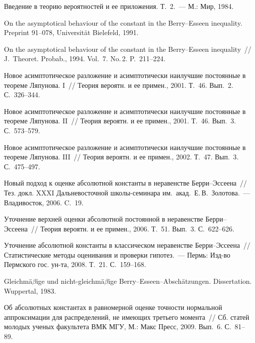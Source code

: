 \begin{multicols}{2}
{{\begin{thebibliography}{99}
 Введение в теорию вероятностей и ее приложения.
Т.~2.~--- М.: Мир, 1984.

 On the asymptotical behaviour of the constant in
the Berry--Esseen inequality. Preprint 91--078, Universit\"at
Bielefeld, 1991.

 On the asymptotical behaviour of the constant in
the Berry--Esseen inequality~// J.~Theoret. Probab., 1994. Vol.~7.
No.\,2. P.~211--224.

 Новое асимптотическое разложение и
асимптотически наилучшие постоянные в теореме Ляпунова. I~// Теория
вероятн. и ее примен., 2001. Т.~46. Вып.~2. С.~326--344.

 Новое асимптотическое разложение и
асимптотически наилучшие постоянные в теореме Ляпунова. II~// Теория
вероятн. и ее примен., 2001. Т.~46. Вып.~3. С.~573--579.

 Новое асимптотическое разложение и
асимптотически наилучшие постоянные в теореме Ляпунова. III~//
Теория вероятн. и ее примен., 2002. Т.~47. Вып.~3. С.~475--497.

Новый подход к оценке абсолютной константы в неравенстве Берри--Эссеена~// Тез. докл. XXXI
Дальневосточной школы-семинара им.\ акад.\ Е.\,В.~Золотова.~---
Владивосток, 2006. C.~19.

 Уточнение верхней оценки абсолютной постоянной в
неравенстве Берри--Эссеена~// Теория вероятн. и ее примен., 2006.
Т.~51. Вып.~3. С.~622--626.

 Уточнение абсолютной константы в классическом
неравенстве Берри--Эссеена~// Статистические методы оценивания и
проверки гипотез.~--- Пермь: Изд-во Пермского гос.
ун-та, 2008. Т.~21. С.~159--168.

 Gleichm{\"a}$\beta$ige und
nicht-gleichm{\"a}$\beta$ige Berry--Esseen--Absch{\"a}tzungen.
Dissertation. Wuppertal, 1983.

Об абсолютных
константах в равномерной оценке точности нормальной аппроксимации
для распределений, не имеющих третьего момента~// Сб. статей
молодых ученых факультета ВМК МГУ, М.: Макс Пресс, 2009. Вып.~6.
С.~81--89.


\end{thebibliography}}}
\end{multicols}
